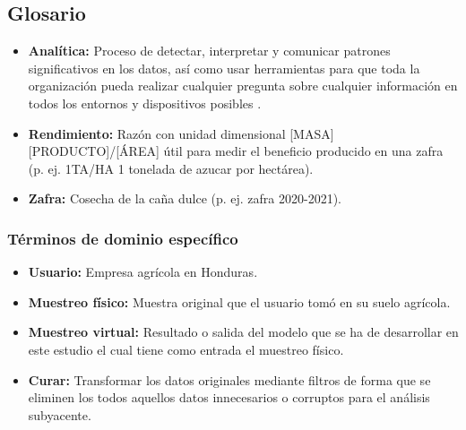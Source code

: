 \documentclass{report}
\begin{document}
\subsection{Glosario}

\begin{itemize}
    \item \textbf{Analítica:} Proceso de detectar, interpretar y comunicar patrones significativos en los datos, así como usar herramientas para que toda la organización pueda realizar cualquier pregunta sobre cualquier información en todos los entornos y dispositivos posibles \cite{oracle-2021}.
    
    \item \textbf{Rendimiento:} Razón con unidad dimensional [MASA][PRODUCTO]/[ÁREA] útil para medir el beneficio producido en una zafra (p. ej. 1TA/HA 1 tonelada de azucar por hectárea).
    
    \item \textbf{Zafra:} Cosecha de la caña dulce (p. ej. zafra 2020-2021).
\end{itemize}

\subsubsection{Términos de dominio específico}

\begin{itemize}
    \item \textbf{Usuario:} Empresa agrícola en Honduras.
    
    \item \textbf{Muestreo físico:} Muestra original que el usuario tomó en su suelo agrícola.
    
    \item \textbf{Muestreo virtual:} Resultado o salida del modelo que se ha de desarrollar en este estudio el cual tiene como entrada el muestreo físico.
    
    \item \textbf{Curar:} Transformar los datos originales mediante filtros de forma que se eliminen los todos aquellos datos innecesarios o corruptos para el análisis subyacente.
\end{itemize}

\printbibliography
\end{document}
